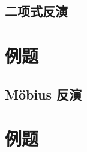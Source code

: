 


\subsection{二项式反演}
\label{incexc:sec:biinv}


\section*{例题}
\label{incexc:ssec:biinv-example}


\questions


\subsection{M\"obius 反演}
\label{incexc:sec:minv}


\section*{例题}
\label{incexc:ssec:minv-example}

\questions
